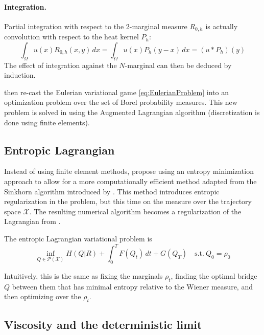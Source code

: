 \documentclass[11pt]{article}
\newcommand{\calP}{\mathcal{P}}
\newcommand{\calX}{\mathcal{X}}
\newcommand{\suchthat}{\mathrm{s.t.}}
\numberwithin{equation}{section}
\theoremstyle{definition}
\begin{document}
\paragraph{Integration.} Partial integration with respect to the 2-marginal measure $R_{0,h}$ is actually convolution with respect to the heat kernel $P_h$:
\[
	\int_\Omega u(x) R_{0,h}(x,y)\,dx =
	\int_\Omega u(x) P_h(y-x)\,dx =
	(u * P_h)(y)
\]
The effect of integration against the $N$-marginal can then be deduced by induction.


\textcite{benamou:hal-01295299,benamou2015lagrangian} then re-cast the Eulerian variational game \eqref{eq:EulerianProblem} into an optimization problem over the set of Borel probability measures. This new problem is solved in \cite{benamou:hal-01295299} using the Augmented Lagrangian algorithm (discretization is done using finite elements).


\subsection{Entropic Lagrangian}

Instead of using finite element methods, \textcite{benamou2018entropy} propose using an entropy minimization approach to allow for a more computationally efficient method adapted from the Sinkhorn algorithm introduced by \textcite{cuturi2013sinkhorn}.
This method introduces entropic regularization in the problem, but this time on the measure over the trajectory space $\calX$. The resulting numerical algorithm becomes a regularization of the Lagrangian from \cite{benamou:hal-01295299,benamou2015lagrangian}.

The entropic Lagrangian variational problem is
\begin{equation}\label{eq:EntropyLagrangianProblem}
\inf_{Q\in\calP(\calX)}
H(Q|R) + \int_0^T F(Q_t)\,dt + G(Q_T) \quad
\suchthat\ Q_0 = \rho_0
\end{equation}

Intuitively, this is the same as fixing the marginals $\rho_t$, finding the optimal bridge $Q$ between them that has minimal entropy relative to the Wiener measure, and then optimizing over the $\rho_t$.


\subsection{Viscosity and the deterministic limit}
\end{document}
